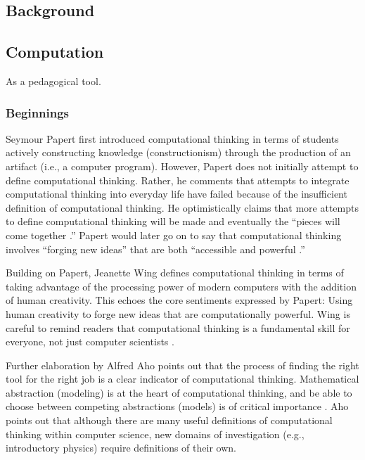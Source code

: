 \documentclass{msuphddissertation}
\begin{document}
\begin{doublespace}
%
%

\chapter{Background}\label{CH2:Background} %

\section{Computation}

As a pedagogical tool.

\subsection{Beginnings}

Seymour Papert first introduced computational thinking in terms of students actively constructing knowledge (constructionism) through the production of an artifact (i.e., a computer program).  However, Papert does not initially attempt to define computational thinking.  Rather, he comments that attempts to integrate computational thinking into everyday life have failed because of the insufficient definition of computational thinking.  He optimistically claims that more attempts to define computational thinking will be made and eventually the ``pieces will come together \cite{Papert1981}.''  Papert would later go on to say that computational thinking involves ``forging new ideas'' that are both ``accessible and powerful \cite{Papert1996}.''

Building on Papert, Jeanette Wing defines computational thinking in terms of taking advantage of the processing power of modern computers with the addition of human creativity.  This echoes the core sentiments expressed by Papert: Using human creativity to forge new ideas that are computationally powerful.  Wing is careful to remind readers that computational thinking is a fundamental skill for everyone, not just computer scientists \cite{Wing2008}.

Further elaboration by Alfred Aho points out that the process of finding the right tool for the right job is a clear indicator of computational thinking.  Mathematical abstraction (modeling) is at the heart of computational thinking, and be able to choose between competing abstractions (models) is of critical importance \cite{Aho2012}.  Aho points out that although there are many useful definitions of computational thinking within computer science, new domains of investigation (e.g., introductory physics) require definitions of their own.


\end{doublespace}
\end{document}
